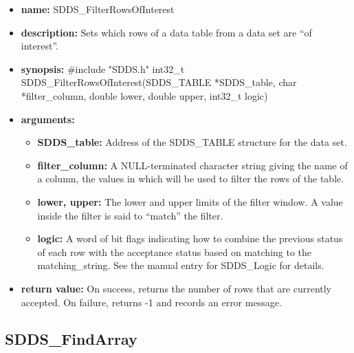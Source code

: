 \documentclass[11pt]{article}
\begin{document}
\begin{itemize}
\item {\bf name:}\newline
SDDS\_FilterRowsOfInterest
\item {\bf description:}\newline
Sets which rows of a data table from a data set are ``of interest''.
\item {\bf synopsis:} \#include "SDDS.h"\newline
int32\_t SDDS\_FilterRowsOfInterest(SDDS\_TABLE *SDDS\_table, char *filter\_column, double lower, double upper, int32\_t logic)
\item {\bf arguments:}
\begin{itemize}
\item {\bf SDDS\_table:} Address of the SDDS\_TABLE structure for the data set.
\item {\bf filter\_column:} A NULL-terminated character string giving the name of a column, the values in which will be used to filter the rows of the table.
\item {\bf lower, upper:} The lower and upper limits of the filter window. A value inside the filter is said to ``match'' the filter.
\item {\bf logic:} A word of bit flags indicating how to combine the previous status of each row with the acceptance status based on matching to the matching\_string. See the manual entry for SDDS\_Logic for details.
\end{itemize}
\item {\bf return value:}\newline
On success, returns the number of rows that are currently accepted. On failure, returns -1 and records an error message.
\end{itemize}

\subsection{SDDS\_FindArray}
\label{SDDS_FindArray}
\end{document}
